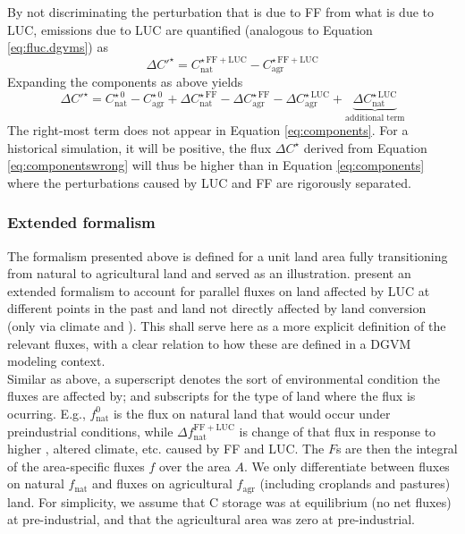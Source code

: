 By not discriminating the perturbation that is due to FF from what is due to LUC, emissions due to LUC are quantified (analogous to Equation \ref{eq:fluc.dgvms}) as
\begin{equation}
\Delta C'^{\star}=C^{\star\,\mathrm{FF+LUC}}_{\mathrm{nat}} - C^{\star\,\mathrm{FF+LUC}}_{\mathrm{agr}}
\end{equation}
Expanding the components as above yields
\begin{equation}
\Delta C'^{\star} = 
C^{\star\,0}_{\mathrm{nat}} - C^{\star\,0}_{\mathrm{agr}} 
+ \Delta C^{\star\,\mathrm{FF}}_{\mathrm{nat}} - \Delta C^{\star\,\mathrm{FF}}_{\mathrm{agr}}
- \Delta C^{\star\,\mathrm{LUC}}_{\mathrm{agr}} + \underbrace{ \Delta C^{\star\,\mathrm{LUC}}_{\mathrm{nat}} }_\text{additional term}
\label{eq:componentswrong}
\end{equation}
The right-most term does not appear in Equation \ref{eq:components}. For a historical simulation, it will be positive, the flux $\Delta C^{\star}$ derived from Equation \ref{eq:componentswrong} will thus be higher than in Equation \ref{eq:components} where the perturbations caused by LUC and FF are rigorously separated.\\

\subsubsection{Extended formalism}
The formalism presented above is defined for a unit land area fully transitioning from natural to agricultural land and served as an illustration. \citep{gasserciais13} present an extended formalism to account for parallel fluxes on land affected by LUC at different points in the past and land not directly affected by land conversion (only via climate and \coo ). This shall serve here as a more explicit definition of the relevant fluxes, with a clear relation to how these are defined in a DGVM modeling context. \\

 Similar as above, a superscript denotes the sort of environmental condition the fluxes are affected by; and subscripts for the type of land where the flux is ocurring. E.g., $f^0_{\mathrm{nat}}$ is the flux on natural land that would occur under preindustrial conditions, while $\Delta f^{\mathrm{FF+LUC}}_{\mathrm{nat}}$ is change of that flux in response to higher \coo , altered climate, etc. caused by FF and LUC. The $F$s are then the integral of the area-specific fluxes $f$ over the area $A$. We only differentiate between fluxes on natural $f_{\mathrm{nat}}$ and fluxes on agricultural $f_{\mathrm{agr}}$ (including croplands and pastures) land. For simplicity, we assume that C storage was at equilibrium (no net fluxes) at pre-industrial, and that the agricultural area was zero at pre-industrial.\\

